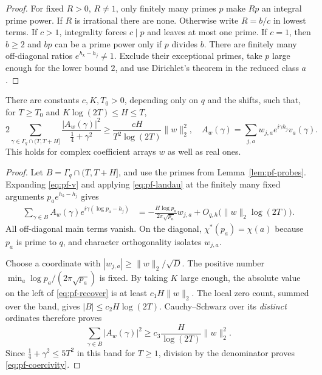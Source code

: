 \begin{proof}
For fixed $R>0$, $R\ne1$, only finitely many primes $p$ make $Rp$ an
integral prime power.  If $R$ is irrational there are none.  Otherwise
write $R=b/c$ in lowest terms.  If $c>1$, integrality forces $c\mid p$
and leaves at most one prime.  If $c=1$, then $b\geq2$ and $bp$ can
be a prime power only if $p$ divides $b$.  There are finitely many
off-diagonal ratios $e^{h_k-h_j}\ne1$.  Exclude their exceptional
primes, take $p$ large enough for the lower bound $2$, and use
Dirichlet's theorem in the reduced class $a$.
\end{proof}

\begin{lemma}
\label{lem:pf-coercivity}
There are constants $c,K,T_0>0$, depending only on $q$ and the shifts,
such that, for $T\geq T_0$ and $K\log(2T)\leq H\leq T$,
\begin{equation}
\label{eq:pf-coercivity}
 2\sum_{\gamma\in\Gamma_q\cap(T,T+H]}
 \frac{|A_w(\gamma)|^2}{\tfrac14+\gamma^2}
       \geq\frac{cH}{T^2\log(2T)}\|w\|_2^2,
 \quad
 A_w(\gamma)=\sum_{j,a}w_{j,a}e^{i\gamma h_j}v_a(\gamma).
\end{equation}
This holds for complex coefficient arrays $w$ as well as real ones.
\end{lemma}

\begin{proof}
Let $B=\Gamma_q\cap(T,T+H]$, and use the primes from
Lemma~\ref{lem:pf-probes}.  Expanding \eqref{eq:pf-v} and applying
\eqref{eq:pf-landau} at the finitely many fixed arguments
$p_a e^{h_k-h_j}$ gives
\begin{align}
\label{eq:pf-recover}
 \sum_{\gamma\in B}A_w(\gamma)
              e^{i\gamma(\log p_a-h_j)}
 &=-\frac{H\log p_a}{2\pi\sqrt{p_a}}w_{j,a}
                    +O_{q,h}\bigl(\|w\|_2\log(2T)\bigr).
\end{align}
All off-diagonal main terms vanish.  On the diagonal,
$\chi^*(p_a)=\chi(a)$ because $p_a$ is prime to $q$, and character
orthogonality isolates $w_{j,a}$.

Choose a coordinate with $|w_{j,a}|\geq\|w\|_2/\sqrt D$.
The positive number
$\min_a\log p_a/(2\pi\sqrt{p_a})$ is fixed.  By taking $K$ large
enough, the absolute value on the left of \eqref{eq:pf-recover} is
at least $c_1H\|w\|_2$.  The local zero count, summed over the band,
gives $|B|\leq c_2H\log(2T)$.  Cauchy--Schwarz over its
\emph{distinct} ordinates therefore proves
\[
 \sum_{\gamma\in B}|A_w(\gamma)|^2
                 \geq c_3\frac{H}{\log(2T)}\|w\|_2^2.
\]
Since $\tfrac14+\gamma^2\leq5T^2$ in this band for $T\geq1$,
division by the denominator proves \eqref{eq:pf-coercivity}.
\end{proof}

